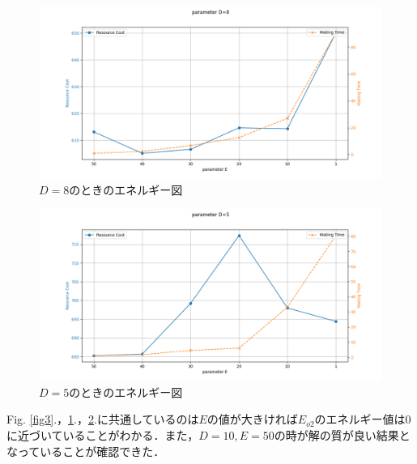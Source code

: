 \documentclass[conference]{IEEEtran}
\begin{document}
\begin{figure}[htbp]
\centerline{\includegraphics[scale=0.3]{./fig/D_8.pdf}}
\caption{$D=8$のときのエネルギー図}
\label{fig4}
\end{figure}

\begin{figure}[htbp]
\centerline{\includegraphics[scale=0.3]{./fig/D_5.pdf}}
\caption{$D=5$のときのエネルギー図}
\label{fig5}
\end{figure}

Fig. \ref{fig3}.，\ref{fig4}.，\ref{fig5}.に共通しているのは$E$の値が大きければ$E_{o2}$のエネルギー値は0に近づいていることがわかる．また，$D=10,E=50$の時が解の質が良い結果となっていることが確認できた．
\end{document}
